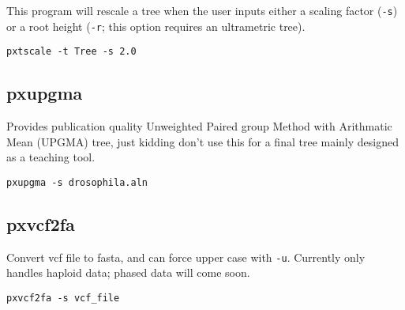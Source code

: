 \documentclass[12pt,letterpaper]{memoir}
\begin{document}
This program will rescale a tree when the user inputs either a scaling factor (\texttt{-s}) or a root height (\texttt{-r}; this option requires an ultrametric tree).

\begin{flushleft}
\begin{verbatim}
pxtscale -t Tree -s 2.0
\end{verbatim}
\end{flushleft}

\subsection{pxupgma}

Provides publication quality Unweighted Paired group Method with Arithmatic Mean (UPGMA) tree, just kidding don't use this for a final tree mainly designed as a teaching tool.

\begin{flushleft}
\begin{verbatim}
pxupgma -s drosophila.aln
\end{verbatim}
\end{flushleft}

\subsection{pxvcf2fa}
Convert vcf file to fasta, and can force upper case with \texttt{-u}.
Currently only handles haploid data; phased data will come soon.

\begin{flushleft}
\begin{verbatim}
pxvcf2fa -s vcf_file
\end{verbatim}
\end{flushleft}
\end{document}
